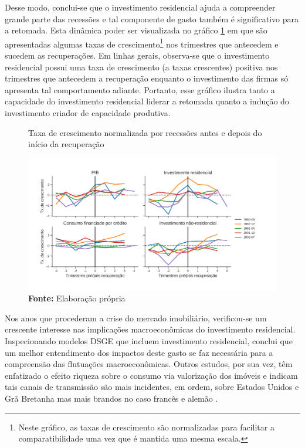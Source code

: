 Desse modo, conclui-se que o investimento residencial ajuda a compreender grande parte das recessões e tal componente de gasto também é significativo para a retomada. Esta dinâmica poder ser visualizada no gráfico \ref{Recuperacao} em que são apresentadas algumas taxas de crescimento\footnote{Neste gráfico, as taxas de crescimento são normalizadas para facilitar a comparatibilidade uma vez que é mantida uma mesma escala.} nos trimestres que antecedem e sucedem as recuperações. Em linhas gerais, observa-se que o investimento residencial possui uma taxa de crescimento (a taxas crescentes) positiva nos trimestres que antecedem a recuperação enquanto o investimento das firmas só apresenta tal comportamento adiante. Portanto, esse gráfico ilustra tanto a capacidade do investimento residencial liderar a retomada quanto a indução do investimento criador de capacidade produtiva.

\begin{figure}[H]
	\centering
	\caption{Taxa de crescimento normalizada por recessões antes e depois do início da recuperação}
	\label{Recuperacao}
	\includegraphics[width=\textwidth]{Fatos_Estilizados/Figs/Recuperacao.png}
	\caption*{\textbf{Fonte:} Elaboração própria}
\end{figure}


Nos anos que procederam a crise do mercado imobiliário, verificou-se um crescente interesse nas implicações macroeconômicas do investimento residencial. Inspecionando modelos DSGE que incluem investimento residencial, \textcite{iacoviello_housing_2010} conclui que um melhor entendimento dos impactos deste gasto se faz necessária para a compreensão das flutuações macroeconômicas. Outros estudos, por sua vez, têm enfatizado o efeito riqueza sobre o consumo via valorização dos imóveis e indicam tais canais de transmissão são mais incidentes, em ordem, sobre Estados Unidos e Grã Bretanha mas mais brandos no caso francês e alemão \cites{sastre_assessment_2010}{chauvin_wealth_2010}{bassanetti_effects_2010}{arrondel_housing_2010}. 

